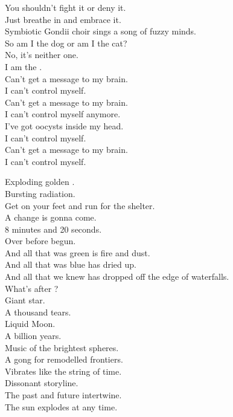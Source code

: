 You shouldn't fight it or deny it. \\
Just breathe in and embrace it. \\
Symbiotic Gondii choir sings a song of fuzzy minds. \\

So am I the dog or am I the cat? \\
No, it's neither one. \\
I am the . \\

Can't get a message to my brain. \\
I can't control myself. \\
Can't get a message to my brain. \\
I can't control myself anymore. \\
I've got oocysts inside my head. \\
I can't control myself. \\
Can't get a message to my brain. \\
I can't control myself. \\




Exploding golden . \\
Bursting radiation. \\
Get on your feet and run for the shelter. \\
A change is gonna come. \\
8 minutes and 20 seconds. \\
Over before begun. \\

And all that was green is fire and dust. \\
And all that was blue has dried up. \\
And all that we knew has dropped off the edge of waterfalls. \\
What's after ? \\

Giant star. \\
A thousand tears. \\
Liquid Moon. \\
A billion years. \\
Music of the brightest spheres. \\
A gong for remodelled frontiers. \\
Vibrates like the string of time. \\
Dissonant storyline. \\
The past and future intertwine. \\
The sun explodes at any time. \\

